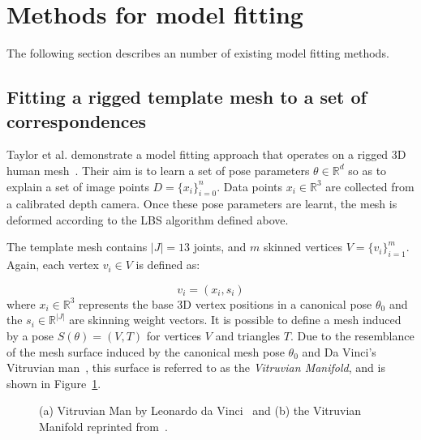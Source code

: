 \section{Methods for model fitting}
The following section describes an number of existing model fitting methods.

\subsection{Fitting a rigged template mesh to a set of correspondences}


Taylor et al. demonstrate a model fitting approach that operates on a rigged 3D human mesh~\cite{taylor2012vitruvian}. Their aim is to learn a set of pose parameters $\theta \in \mathbb{R}^{d}$ so as to explain a set of image points $D = \{x_{i}\}_{i=0}^{n}$. Data points $x_{i} \in \mathbb{R}^{3}$ are collected from a calibrated depth camera. Once these pose parameters are learnt, the mesh is deformed according to the LBS algorithm defined above.

The template mesh contains $|J| = 13$ joints, and $m$ skinned vertices ${V} = \{v_{i}\}_{i=1}^{m}$. Again, each vertex $v_{i} \in V$ is defined as:

\begin{equation}
    v_{i} = (x_{i}, s_{i})
\end{equation}
where $x_{i} \in \mathbb{R}^{3}$ represents the base 3D vertex positions in a canonical pose $\theta_{0}$ and the $s_{i} \in \mathbb{R}^{|J|}$ are skinning weight vectors. It is possible to define a mesh induced by a pose $S(\theta) = (V, T)$ for vertices $V$ and triangles $T$. Due to the resemblance of the mesh surface induced by the canonical mesh pose $\theta_{0}$ and Da Vinci's Vitruvian man~\cite{davinci}, this surface is referred to as the \emph{Vitruvian Manifold}, and is shown in Figure~\ref{fig:vitruvian_man}. 

\begin{figure}[H] %
    \caption{(a) Vitruvian Man by Leonardo da Vinci~\cite{davinci} and (b) the Vitruvian Manifold reprinted from~\cite{taylor2012vitruvian}.}
    \label{fig:vitruvian_man}
\end{figure}

